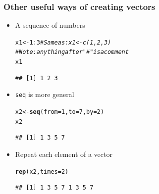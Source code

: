 \documentclass[color=usenames,dvipsnames]{beamer}\usepackage[]{graphicx}\usepackage[]{color}
\makeatletter
\newcommand{\hlnum}[1]{\textcolor[rgb]{0.686,0.059,0.569}{#1}}%
\newcommand{\hlcom}[1]{\textcolor[rgb]{0.678,0.584,0.686}{\textit{#1}}}%
\newcommand{\hlopt}[1]{\textcolor[rgb]{0,0,0}{#1}}%
\newcommand{\hlstd}[1]{\textcolor[rgb]{0.345,0.345,0.345}{#1}}%
\newcommand{\hlkwb}[1]{\textcolor[rgb]{0.69,0.353,0.396}{#1}}%
\newcommand{\hlkwc}[1]{\textcolor[rgb]{0.333,0.667,0.333}{#1}}%
\newcommand{\hlkwd}[1]{\textcolor[rgb]{0.737,0.353,0.396}{\textbf{#1}}}%
\newenvironment{kframe}{%
 \def\at@end@of@kframe{}%
 \ifinner\ifhmode%
  \def\at@end@of@kframe{\end{minipage}}%
  \begin{minipage}{\columnwidth}%
 \fi\fi%
 \def\FrameCommand##1{\hskip\@totalleftmargin \hskip-\fboxsep
 \colorbox{shadecolor}{##1}\hskip-\fboxsep
     \hskip-\linewidth \hskip-\@totalleftmargin \hskip\columnwidth}%
 \MakeFramed {\advance\hsize-\width
   \@totalleftmargin\z@ \linewidth\hsize
   \@setminipage}}%
 {\par\unskip\endMakeFramed%
 \at@end@of@kframe}
\newenvironment{knitrout}{}{} %
\makeatother
\begin{document}


%


\begin{frame}[fragile]
  \frametitle{Other useful ways of creating vectors}
\begin{itemize}[<+->]
  \item { A sequence of numbers}
\begin{knitrout}
\color{fgcolor}\begin{kframe}
\begin{alltt}
\hlstd{x1} \hlkwb{<-} \hlnum{1}\hlopt{:}\hlnum{3} \hlcom{# Same as: x1 <- c(1, 2, 3)}
          \hlcom{# Note: anything after "#" is a comment}
\hlstd{x1}
\end{alltt}
\begin{verbatim}
## [1] 1 2 3
\end{verbatim}
\end{kframe}
\end{knitrout}
\item \verb+seq+ is more general
\begin{knitrout}
\color{fgcolor}\begin{kframe}
\begin{alltt}
\hlstd{x2} \hlkwb{<-} \hlkwd{seq}\hlstd{(}\hlkwc{from}\hlstd{=}\hlnum{1}\hlstd{,} \hlkwc{to}\hlstd{=}\hlnum{7}\hlstd{,} \hlkwc{by}\hlstd{=}\hlnum{2}\hlstd{)}
\hlstd{x2}
\end{alltt}
\begin{verbatim}
## [1] 1 3 5 7
\end{verbatim}
\end{kframe}
\end{knitrout}
\item Repeat each element of a vector
\begin{knitrout}
\color{fgcolor}\begin{kframe}
\begin{alltt}
\hlkwd{rep}\hlstd{(x2,} \hlkwc{times}\hlstd{=}\hlnum{2}\hlstd{)}
\end{alltt}
\begin{verbatim}
## [1] 1 3 5 7 1 3 5 7
\end{verbatim}
\end{kframe}
\end{knitrout}
\end{itemize}
\end{frame}
\end{document}
